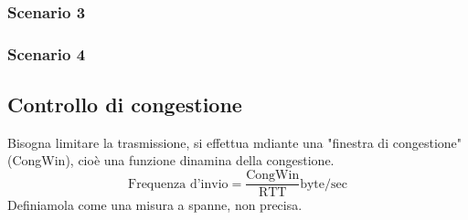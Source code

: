 \subsubsection*{Scenario 3}

\subsubsection*{Scenario 4}

\subsection{Controllo di congestione}
Bisogna limitare la trasmissione, si effettua mdiante una "finestra di congestione" (CongWin), cioè una funzione dinamina della congestione. 
\[\text{Frequenza d'invio} = \frac{\text{CongWin}}{\text{RTT}} \text{byte/sec}\] 
Definiamola come una misura a spanne, non precisa. \\

